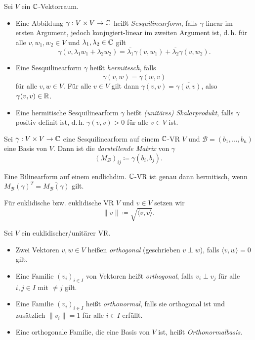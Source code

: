 \documentclass{cheat-sheet}
\newcommand{\BB}{\mathcal{B}}
\begin{document}
\begin{defn}
Sei $V$ ein $\mathbb{C}$-Vektorraum.
\begin{itemize}
  \item Eine Abbildung $\gamma : V \times V \to \mathbb{C}$ heißt \emph{Sesquilinearform}, falls $\gamma$ linear im ersten Argument, jedoch konjugiert-linear im zweiten Argument ist, d.\,h. für alle $v, w_1, w_2 \in V$ und $\lambda_1, \lambda_2 \in \mathbb{C}$ gilt
  \[ \gamma(v, \lambda_1 w_1 + \lambda_2 w_2) = \overline{\lambda_1} \gamma(v, w_1) + \overline{\lambda_2} \gamma(v, w_2). \]
  \item Eine Sesquilinearform $\gamma$ heißt \emph{hermitesch}, falls
  \[ \gamma(v, w) = \overline{\gamma(w, v)} \]
  für alle $v, w \in V$. Für alle $v \in V$ gilt dann $\gamma(v, v) = \overline{\gamma(v, v)}$, also $\gamma(v, v) \in \mathbb{R}$.
  \item Eine hermitische Sesquilinearform $\gamma$ heißt \emph{(unitäres) Skalarprodukt}, falls $\gamma$ positiv definit ist, d.\,h. $\gamma(v, v) > 0$ für alle $v \in V$ ist.
\end{itemize}
\end{defn}

\begin{defn}
Sei $\gamma : V \times V \to \mathbb{C}$ eine Sesquilinearform auf einem $\mathbb{C}$-VR $V$ und $\BB = (b_1, ..., b_n)$ eine Basis von $V$. Dann ist die \emph{darstellende Matrix} von $\gamma$
\[ (M_{\BB})_{ij} \coloneqq \gamma(b_i, b_j). \]
\end{defn}

\begin{bem}
Eine Bilinearform auf einem endlichdim. $\mathbb{C}$-VR ist genau dann hermitisch, wenn $M_{\BB}(\gamma)^{T} = \overline{M_{\BB}(\gamma)}$ gilt. 
\end{bem}

\begin{defn}
Für euklidische bzw. euklidische VR $V$ und $v \in V$ setzen wir
\[ \| v \| \coloneqq \sqrt{ \langle v , v \rangle }. \]
\end{defn}

\begin{defn}
Sei $V$ ein euklidischer/unitärer VR.
\begin{itemize}
  \item Zwei Vektoren $v, w \in V$ heißen \emph{orthogonal} (geschrieben $v \perp w$), falls $\langle v , w \rangle = 0$ gilt.
  \item Eine Familie $(v_i)_{i \in I}$ von Vektoren heißt \emph{orthogonal}, falls $v_i \perp v_j$ für alle $i, j \in I$ mit $ \not= j$ gilt.
  \item Eine Familie $(v_i)_{i \in I}$ heißt \emph{orthonormal}, falls sie orthogonal ist und zusätzlich $\| v_i \| = 1$ für alle $i \in I$ erfüllt.
  \item Eine orthogonale Familie, die eine Basis von $V$ ist, heißt \emph{Orthonormalbasis}.
\end{itemize}
\end{defn}
\end{document}
